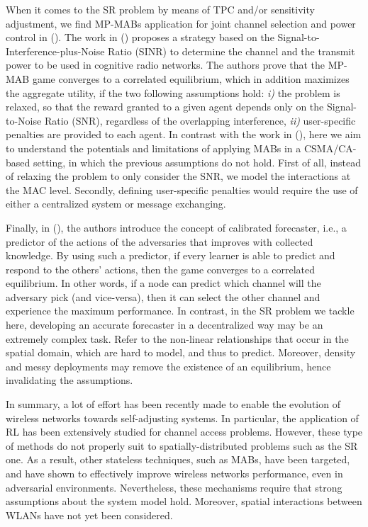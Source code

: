 \documentclass[preprint,12pt]{elsarticle}
\begin{document}
When it comes to the SR problem by means of TPC and/or sensitivity adjustment, we find MP-MABs application for joint channel selection and power control in (\citealp{maghsudi2015joint, maghsudi2015channel}). The work in (\citealp{maghsudi2015joint}) proposes a strategy based on the Signal-to-Interference-plus-Noise Ratio (SINR) to determine the channel and the transmit power to be used in cognitive radio networks. The authors prove that the MP-MAB game converges to a correlated equilibrium, which in addition maximizes the aggregate utility, if the two following assumptions hold: \emph{i)} the problem is relaxed, so that the reward granted to a given agent depends only on the Signal-to-Noise Ratio (SNR), regardless of the overlapping interference, \emph{ii)} user-specific penalties are provided to each agent. In contrast with the work in (\citealp{maghsudi2015joint}), here we aim to understand the potentials and limitations of applying MABs in a CSMA/CA-based setting, in which the previous assumptions do not hold. First of all, instead of relaxing the problem to only consider the SNR, we model the interactions at the MAC level. Secondly, defining user-specific penalties would require the use of either a centralized system or message exchanging.

Finally, in (\citealp{maghsudi2015channel}), the authors introduce the concept of calibrated forecaster, i.e., a predictor of the actions of the adversaries that improves with collected knowledge. By using such a predictor, if every learner is able to predict and respond to the others' actions, then the game converges to a correlated equilibrium. In other words, if a node can predict which channel will the adversary pick (and vice-versa), then it can select the other channel and experience the maximum performance. In contrast, in the SR problem we tackle here, developing an accurate forecaster in a decentralized way may be an extremely complex task. Refer to the non-linear relationships that occur in the spatial domain, which are hard to model, and thus to predict. Moreover, density and messy deployments may remove the existence of an equilibrium, hence invalidating the assumptions.

In summary, a lot of effort has been recently made to enable the evolution of wireless networks towards self-adjusting systems. In particular, the application of RL has been extensively studied for channel access problems. However, these type of methods do not properly suit to spatially-distributed problems such as the SR one. As a result, other stateless techniques, such as MABs, have been targeted, and have shown to effectively improve wireless networks performance, even in adversarial environments. Nevertheless, these mechanisms require that strong assumptions about the system model hold. Moreover, spatial interactions between WLANs have not yet been considered.
\end{document}
